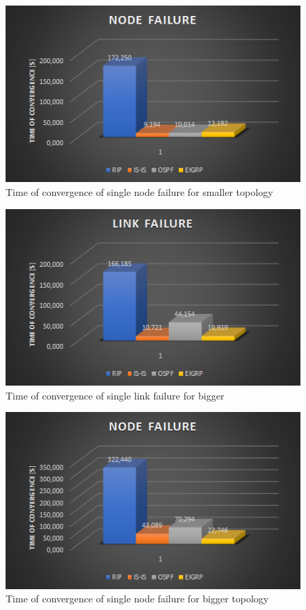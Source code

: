 \documentclass[conference,compsoc]{IEEEtran}
\begin{document}
\begin{figure}
  \centering
  \includegraphics[width=\textwidth]{images/f4.png}
  \caption{Time of convergence of single node failure for smaller topology}
\end{figure}


\begin{figure}
  \centering
  \includegraphics[width=\textwidth]{images/f5.png}
  \caption{Time of convergence of single link failure for bigger }
\end{figure}

\begin{figure}
  \centering
  \includegraphics[width=\textwidth]{images/f6.png}
  \caption{Time of convergence of single node failure for bigger topology}
\end{figure}
\end{document}
